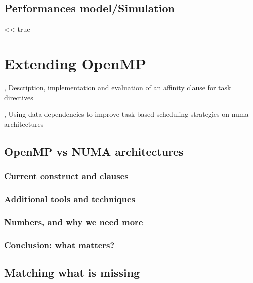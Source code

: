 \section{Performances model/Simulation}


\begin{savequote}[6cm]
<< truc
\end{savequote}

\chapter{Extending OpenMP}\label{chap:contrib:TODO}
\chaptertoc


%



\cite{Virouleau2016}, Description, implementation and evaluation of an affinity clause for task directives

\cite{Virouleau2016b}, Using data dependencies to improve task-based scheduling strategies on numa architectures


\section{OpenMP vs NUMA architectures}

\subsection{Current construct and clauses}
\subsection{Additional tools and techniques}
\subsection{Numbers, and why we need more}
\subsection{Conclusion: what matters?}

\section{Matching what is missing}
